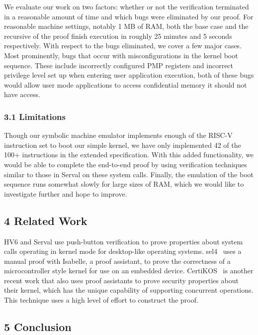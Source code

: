 \documentclass[]{article}
\begin{document}
We evaluate our work on two factors: whether or not the verification
terminated in a reasonable amount of time and which bugs were eliminated
by our proof. For reasonable machine settings, notably 1 MB of RAM, both
the base case and the recursive of the proof finish execution in roughly
25 minutes and 5 seconds respectively. With respect to the bugs
eliminated, we cover a few major cases. Most prominently, bugs that
occur with misconfigurations in the kernel boot sequence. These include
incorrectly configured PMP registers and incorrect privilege level set
up when entering user application execution, both of these bugs would
allow user mode applications to access confidential memory it should not
have access.

\subsubsection{3.1 Limitations}\label{limitations}

Though our symbolic machine emulator implements enough of the RISC-V
instruction set to boot our simple kernel, we have only implemented 42
of the 100+ instructions in the extended specification. With this added
functionality, we would be able to complete the end-to-end proof by
using verification techniques similar to those in Serval on these system
calls. Finally, the emulation of the boot sequence runs somewhat slowly
for large sizes of RAM, which we would like to investigate further and
hope to improve.

\subsection{4 Related Work}\label{related-work}

HV6 and Serval use push-button verification to prove properties about
system calls operating in kernel mode for desktop-like operating
systems. sel4~\cite{10.1145/1629575.1629596} uses a manual proof with Isabelle, a proof
assistant, to prove the correctness of a microcontroller style kernel
for use on an embedded device. CertiKOS~\cite{199344} is another recent work
that also uses proof assistants to prove security properties about their
kernel, which has the unique capability of supporting concurrent
operations. This technique uses a high level of effort to construct the
proof.

\subsection{5 Conclusion}\label{conclusion}
\end{document}
